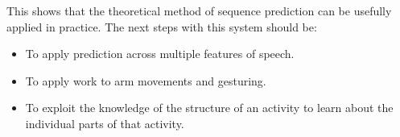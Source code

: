 This shows that the theoretical method of sequence prediction can be
usefully applied in practice.  The next steps with this system should
be:

\begin{itemize}

\item To apply prediction across multiple features of speech.

\item To apply work to arm movements and gesturing.

\item To exploit the knowledge of the structure of an activity to
learn about the individual parts of that activity.

\end{itemize}


